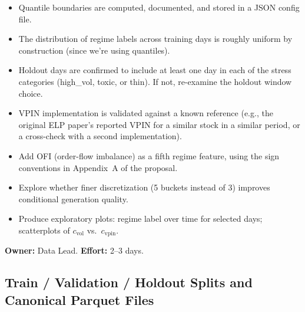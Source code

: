 \documentclass[11pt,a4paper]{article}
\begin{document}
\begin{successbox}
  \begin{itemize}[nosep]
    \item Quantile boundaries are computed, documented, and stored in a JSON config file.
    \item The distribution of regime labels across training days is roughly uniform by construction (since we're using quantiles).
    \item Holdout days are confirmed to include at least one day in each of the stress categories (high\_vol, toxic, or thin).  If not, re-examine the holdout window choice.
    \item VPIN implementation is validated against a known reference (e.g., the original ELP paper's reported VPIN for a similar stock in a similar period, or a cross-check with a second implementation).
  \end{itemize}
\end{successbox}

\begin{deepbox}
  \begin{itemize}[nosep]
    \item Add OFI (order-flow imbalance) as a fifth regime feature, using the sign conventions in Appendix~A of the proposal.
    \item Explore whether finer discretization (5 buckets instead of 3) improves conditional generation quality.
    \item Produce exploratory plots: regime label over time for selected days; scatterplots of $c_{\text{vol}}$ vs.\ $c_{\text{vpin}}$.
  \end{itemize}
\end{deepbox}

\textbf{Owner:} Data Lead. \quad \textbf{Effort:} 2--3 days.

\subsection{Train / Validation / Holdout Splits and Canonical Parquet Files}
\end{document}
